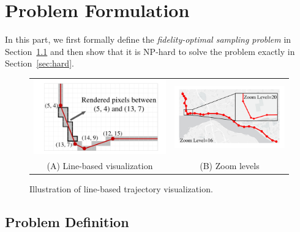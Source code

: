 \section{Problem Formulation}\label{sec:pro}
In this part, we first formally define the \textit{fidelity-optimal sampling problem} in Section~\ref{sec:def} and then show that it is NP-hard to solve the problem exactly in Section~\ref{sec:hard}.

\begin{figure}
	\centering
	\small
	\begin{tabular}{cc}
        \includegraphics[width=0.43\columnwidth]{pictures/problemsolveing/RenderedPixels}
		&
        \includegraphics[width=0.48\columnwidth]{pictures/problemsolveing/TrajZoomIn}		
		\\
		(A) Line-based visualization
		&
        (B) Zoom levels
	\end{tabular}
	\vspace{-4mm}
	\caption{Illustration of line-based trajectory visualization.} \label{fig:line}
	\vspace{-6mm}
\end{figure}


\subsection{Problem Definition}\label{sec:def}


